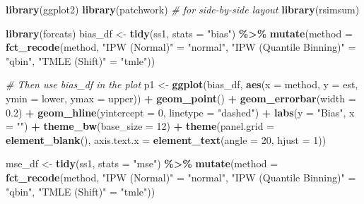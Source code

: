 \documentclass[
]{article}
\newenvironment{Shaded}{\begin{snugshade}}{\end{snugshade}}
\newcommand{\AttributeTok}[1]{\textcolor[rgb]{0.13,0.29,0.53}{#1}}
\newcommand{\CommentTok}[1]{\textcolor[rgb]{0.56,0.35,0.01}{\textit{#1}}}
\newcommand{\DecValTok}[1]{\textcolor[rgb]{0.00,0.00,0.81}{#1}}
\newcommand{\FloatTok}[1]{\textcolor[rgb]{0.00,0.00,0.81}{#1}}
\newcommand{\FunctionTok}[1]{\textcolor[rgb]{0.13,0.29,0.53}{\textbf{#1}}}
\newcommand{\NormalTok}[1]{#1}
\newcommand{\OtherTok}[1]{\textcolor[rgb]{0.56,0.35,0.01}{#1}}
\newcommand{\SpecialCharTok}[1]{\textcolor[rgb]{0.81,0.36,0.00}{\textbf{#1}}}
\newcommand{\StringTok}[1]{\textcolor[rgb]{0.31,0.60,0.02}{#1}}
\begin{document}
\begin{Shaded}
\begin{Highlighting}[]
\FunctionTok{library}\NormalTok{(ggplot2)}
\FunctionTok{library}\NormalTok{(patchwork)  }\CommentTok{\# for side{-}by{-}side layout}
\FunctionTok{library}\NormalTok{(rsimsum)}

\FunctionTok{library}\NormalTok{(forcats)}
\NormalTok{bias\_df }\OtherTok{\textless{}{-}} \FunctionTok{tidy}\NormalTok{(ss1, }\AttributeTok{stats =} \StringTok{"bias"}\NormalTok{) }\SpecialCharTok{\%\textgreater{}\%}
  \FunctionTok{mutate}\NormalTok{(}\AttributeTok{method =} \FunctionTok{fct\_recode}\NormalTok{(method,}
                             \StringTok{"IPW (Normal)"} \OtherTok{=} \StringTok{"normal"}\NormalTok{,}
                             \StringTok{"IPW (Quantile Binning)"} \OtherTok{=} \StringTok{"qbin"}\NormalTok{,}
                             \StringTok{"TMLE (Shift)"} \OtherTok{=} \StringTok{"tmle"}\NormalTok{))}

\CommentTok{\# Then use bias\_df in the plot}
\NormalTok{p1 }\OtherTok{\textless{}{-}} \FunctionTok{ggplot}\NormalTok{(bias\_df, }\FunctionTok{aes}\NormalTok{(}\AttributeTok{x =}\NormalTok{ method, }\AttributeTok{y =}\NormalTok{ est, }\AttributeTok{ymin =}\NormalTok{ lower, }\AttributeTok{ymax =}\NormalTok{ upper)) }\SpecialCharTok{+}
  \FunctionTok{geom\_point}\NormalTok{() }\SpecialCharTok{+}
  \FunctionTok{geom\_errorbar}\NormalTok{(}\AttributeTok{width =} \FloatTok{0.2}\NormalTok{) }\SpecialCharTok{+}
  \FunctionTok{geom\_hline}\NormalTok{(}\AttributeTok{yintercept =} \DecValTok{0}\NormalTok{, }\AttributeTok{linetype =} \StringTok{"dashed"}\NormalTok{) }\SpecialCharTok{+}
  \FunctionTok{labs}\NormalTok{(}\AttributeTok{y =} \StringTok{"Bias"}\NormalTok{, }\AttributeTok{x =} \StringTok{""}\NormalTok{) }\SpecialCharTok{+}
  \FunctionTok{theme\_bw}\NormalTok{(}\AttributeTok{base\_size =} \DecValTok{12}\NormalTok{) }\SpecialCharTok{+}
  \FunctionTok{theme}\NormalTok{(}\AttributeTok{panel.grid =} \FunctionTok{element\_blank}\NormalTok{(),}
        \AttributeTok{axis.text.x =} \FunctionTok{element\_text}\NormalTok{(}\AttributeTok{angle =} \DecValTok{20}\NormalTok{, }\AttributeTok{hjust =} \DecValTok{1}\NormalTok{))}

\NormalTok{mse\_df }\OtherTok{\textless{}{-}} \FunctionTok{tidy}\NormalTok{(ss1, }\AttributeTok{stats =} \StringTok{"mse"}\NormalTok{) }\SpecialCharTok{\%\textgreater{}\%}
  \FunctionTok{mutate}\NormalTok{(}\AttributeTok{method =} \FunctionTok{fct\_recode}\NormalTok{(method,}
                             \StringTok{"IPW (Normal)"} \OtherTok{=} \StringTok{"normal"}\NormalTok{,}
                             \StringTok{"IPW (Quantile Binning)"} \OtherTok{=} \StringTok{"qbin"}\NormalTok{,}
                             \StringTok{"TMLE (Shift)"} \OtherTok{=} \StringTok{"tmle"}\NormalTok{))}


\end{Highlighting}
\end{Shaded}
\end{document}
